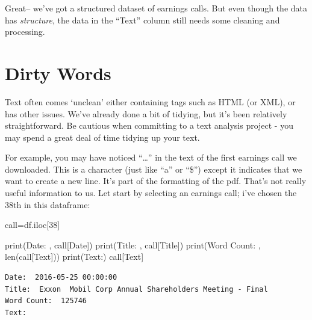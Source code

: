 \documentclass[
  letterpaper,
  DIV=11,
  numbers=noendperiod]{scrreprt}
\newenvironment{Shaded}{\begin{snugshade}}{\end{snugshade}}
\newcommand{\BuiltInTok}[1]{\textcolor[rgb]{0.00,0.23,0.31}{#1}}
\newcommand{\DecValTok}[1]{\textcolor[rgb]{0.68,0.00,0.00}{#1}}
\newcommand{\NormalTok}[1]{\textcolor[rgb]{0.00,0.23,0.31}{#1}}
\newcommand{\OperatorTok}[1]{\textcolor[rgb]{0.37,0.37,0.37}{#1}}
\newcommand{\StringTok}[1]{\textcolor[rgb]{0.13,0.47,0.30}{#1}}
\begin{document}
Great-- we've got a structured dataset of earnings calls. But even
though the data has \emph{structure}, the data in the ``Text'' column
still needs some cleaning and processing.

\hypertarget{dirty-words}{%
\section{Dirty Words}\label{dirty-words}}

Text often comes `unclean' either containing tags such as HTML (or XML),
or has other issues. We've already done a bit of tidying, but it's been
relatively straightforward. Be cautious when committing to a text
analysis project - you may spend a great deal of time tidying up your
text.

For example, you may have noticed ``\n\n\n\n\n\n\n\n\ldots{}'' in the
text of the first earnings call we downloaded. This is a character (just
like ``a'' or ``\$'') except it indicates that we want to create a new
line. It's part of the formatting of the pdf. That's not really useful
information to us. Let start by selecting an earnings call; i've chosen
the 38th in this dataframe:

\begin{Shaded}
\begin{Highlighting}[]
\NormalTok{call}\OperatorTok{=}\NormalTok{df.iloc[}\DecValTok{38}\NormalTok{]}

\BuiltInTok{print}\NormalTok{(}\StringTok{\textquotesingle{}Date: \textquotesingle{}}\NormalTok{, call[}\StringTok{\textquotesingle{}Date\textquotesingle{}}\NormalTok{])}
\BuiltInTok{print}\NormalTok{(}\StringTok{\textquotesingle{}Title: \textquotesingle{}}\NormalTok{, call[}\StringTok{\textquotesingle{}Title\textquotesingle{}}\NormalTok{])}
\BuiltInTok{print}\NormalTok{(}\StringTok{\textquotesingle{}Word Count: \textquotesingle{}}\NormalTok{, }\BuiltInTok{len}\NormalTok{(call[}\StringTok{\textquotesingle{}Text\textquotesingle{}}\NormalTok{]))}
\BuiltInTok{print}\NormalTok{(}\StringTok{\textquotesingle{}Text:\textquotesingle{}}\NormalTok{)}
\NormalTok{call[}\StringTok{\textquotesingle{}Text\textquotesingle{}}\NormalTok{]}
\end{Highlighting}
\end{Shaded}

\begin{verbatim}
Date:  2016-05-25 00:00:00
Title:  Exxon  Mobil Corp Annual Shareholders Meeting - Final
Word Count:  125746
Text:
\end{verbatim}
\end{document}
